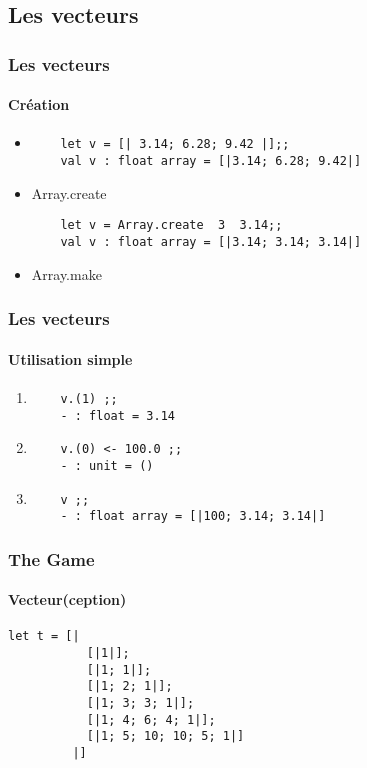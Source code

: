 \subsection{Les vecteurs}
\begin{frame}[fragile]
\frametitle{Les vecteurs}
	\framesubtitle{Création}
	\begin{itemize}
	\item
	\begin{lstlisting}
	let v = [| 3.14; 6.28; 9.42 |];;
	val v : float array = [|3.14; 6.28; 9.42|]
	\end{lstlisting}

	\item Array.create
	\begin{lstlisting}
	let v = Array.create  3  3.14;;
	val v : float array = [|3.14; 3.14; 3.14|]
	\end{lstlisting}

	\item Array.make
	\end{itemize}
\end{frame}


\begin{frame}[fragile]
\frametitle{Les vecteurs}
\framesubtitle{Utilisation simple}
	\begin{enumerate}
	\item
	\begin{lstlisting}
	v.(1) ;;
	- : float = 3.14
	\end{lstlisting}

	\item
	\begin{lstlisting}
	v.(0) <- 100.0 ;;
	- : unit = ()
	\end{lstlisting}

	\item
	\begin{lstlisting}
	v ;;
	- : float array = [|100; 3.14; 3.14|]
	\end{lstlisting}
	\end{enumerate}
\end{frame}

\begin{frame}[fragile]
\frametitle{The Game}
\framesubtitle{Vecteur(ception)}
\begin{lstlisting}
let t = [| 
           [|1|];
           [|1; 1|];
           [|1; 2; 1|];
           [|1; 3; 3; 1|];
           [|1; 4; 6; 4; 1|];
           [|1; 5; 10; 10; 5; 1|]
         |] 
	\end{lstlisting}
\end{frame}

